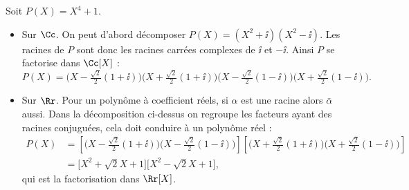 \documentclass[class=report,crop=false]{standalone}
\begin{document}
\begin{exemple}
Soit $P(X)=X^4+1$.
\begin{itemize}
  \item Sur $\Cc$. On peut d'abord décomposer $P(X)=(X^2+\ii)(X^2-\ii)$.
Les racines de $P$ sont donc les racines carrées complexes de $\ii$ et $-\ii$.
Ainsi $P$ se factorise dans $\Cc[X]$ :
$$P(X)=\big(X-\tfrac{\sqrt2}{2}(1+\ii)\big)\big(X+\tfrac{\sqrt2}{2}(1+\ii)\big)\big(X-\tfrac{\sqrt2}{2}(1-\ii)\big)
\big(X+\tfrac{\sqrt2}{2}(1-\ii)\big).$$

  \item Sur $\Rr$. Pour un polynôme à coefficient réels, si $\alpha$ est une racine
alors $\bar \alpha$ aussi. Dans la décomposition ci-dessus on regroupe les facteurs ayant des racines conjuguées,
cela doit conduire à un polynôme réel :
\begin{align*}
P(X)&=\left[\big(X-\tfrac{\sqrt2}{2}(1+\ii)\big)\big(X-\tfrac{\sqrt2}{2}(1-\ii)\big)\right]
\left[\big(X+\tfrac{\sqrt2}{2}(1+\ii)\big)\big(X+\tfrac{\sqrt2}{2}(1-\ii)\big)\right]\\
&= \big[X^2+\sqrt2X+1\big]\big[X^2-\sqrt2X+1\big],  
\end{align*}
qui est la factorisation dans $\Rr[X]$.
\end{itemize}
\end{exemple}




\end{document}
